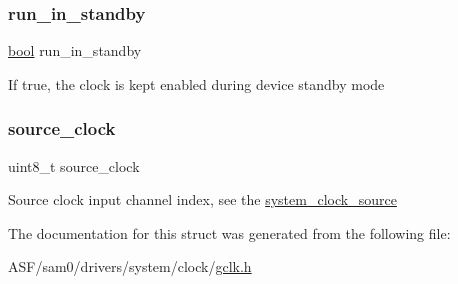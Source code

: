 \subsubsection{\texorpdfstring{run\_in\_standby}{run\_in\_standby}}
{\footnotesize\ttfamily \mbox{\hyperlink{group__group__sam0__utils_ga97a80ca1602ebf2303258971a2c938e2}{bool}} run\+\_\+in\+\_\+standby}

If {\ttfamily true}, the clock is kept enabled during device standby mode \mbox{\label{structsystem__gclk__gen__config_af287f9ec1ba1d3ca74d44f04ea746e5d}} 
\subsubsection{\texorpdfstring{source\_clock}{source\_clock}}
{\footnotesize\ttfamily uint8\+\_\+t source\+\_\+clock}

Source clock input channel index, see the \mbox{\hyperlink{group__asfdoc__sam0__system__clock__group_ga86882dc960f2552722e9713da97fcc58}{system\+\_\+clock\+\_\+source}} 

The documentation for this struct was generated from the following file\+:\begin{DoxyCompactItemize}
\item 
A\+S\+F/sam0/drivers/system/clock/\mbox{\hyperlink{drivers_2system_2clock_2gclk_8h}{gclk.\+h}}\end{DoxyCompactItemize}
